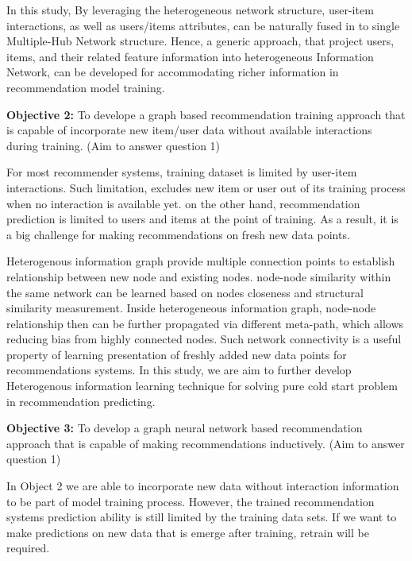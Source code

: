 In this study, By leveraging the heterogeneous network structure, user-item interactions, as well as users/items attributes, can be naturally fused in to single Multiple-Hub Network \citep{Shi2017} structure. Hence, a generic approach, that project users, items, and their related feature information into heterogeneous Information Network, can be developed for accommodating richer information in recommendation model training.


\bigskip
\textbf{Objective 2:} To develope a graph based recommendation training approach that is capable of incorporate new item/user data without available interactions during training. (Aim to answer question 1)

For most recommender systems, training dataset is limited by user-item interactions. Such limitation, excludes new item or user out of its training process when no interaction is available yet. on the other hand, recommendation prediction is limited to users and items at the point of training. As a result, it is a big challenge for making recommendations on fresh new data points. 

Heterogenous information graph provide multiple connection points to establish relationship between new node and existing nodes. node-node similarity within the same network can be learned based on nodes closeness and structural similarity measurement. Inside heterogeneous information graph, node-node relationship then can be further propagated via different meta-path, which allows reducing bias from highly connected nodes. Such network connectivity is a useful property of learning presentation of freshly added new data points for recommendations systems. In this study, we are aim to further develop Heterogenous information learning technique for solving pure cold start problem in recommendation predicting.

\bigskip
\textbf{Objective 3:} To develop a graph neural network based recommendation approach that is capable of making recommendations inductively. (Aim to answer question 1)

In Object 2 we are able to incorporate new data without interaction information to be part of model training process. However, the trained recommendation systems prediction ability is still limited by the training data sets. If we want to make predictions on new data that is emerge after training, retrain will be required. 

